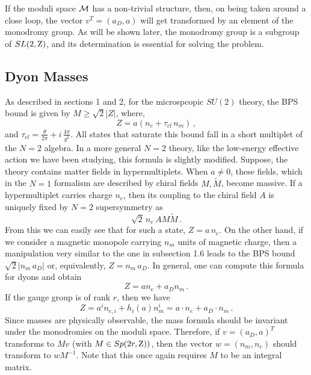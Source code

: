 If the moduli space ${\cal M}$ has a non-trivial structure, then, on
being taken around a close loop, the vector $v^T=(a_D, a)$ will get
transformed by an element of the monodromy group. As  will be shown
later, the monodromy group is a subgroup of $SL(2,{\rm Z})$, and its
determination is essential for solving the problem. 

\subsection{Dyon Masses}

As described in sections 1 and 2, for the microspcopic $SU(2)$ theory,
the BPS bound is given by $M \geq \sqrt{2} |Z|$, where,
$$
Z=a(n_e + \tau_{cl}\, n_m)\,, 
$$
and $\tau_{cl}=\frac{\theta}{2\pi}+i\,\frac{4\pi}{g^2}$. All states
that saturate this bound fall in a short multiplet of the $N=2$
algebra. In a more general $N=2$ theory, like the low-energy effective
action we have been studying, this formula is slightly modified. 
Suppose, the theory contains matter fields in hypermultiplets. When
$a\ne 0$, these fields, which in the $N=1$ formalism are described by
chiral fields $M, \widetilde M$, become massive. If a hypermultiplet
carries charge $n_e$, then its coupling to the chiral field $A$ is
uniquely fixed by $N=2$ supersymmetry as 
$$
\sqrt{2}\,n_e \, A M \widetilde M\,.
$$
From this we can easily see that for such a state, $Z=a\,n_e$. On the
other hand, if we consider a magnetic monopole carrying $n_m$ units of
magnetic charge, then a manipulation very similar to the one in
subsection 1.6 leads to the BPS bound $\sqrt{2}|n_m\,a_D|$ or,
equivalently, $Z=n_m\,a_D$. In general, one can compute this formula
for dyons and obtain 
\begin{equation}
Z = a n_e + a_D n_m\,.
\label{ZaaD}
\end{equation}
If the gauge group is of rank $r$, then we have
$$
Z = a^i n_{e,i} + h_i(a) n^i_m =a\cdot n_e +a_D \cdot n_m\,.
$$
Since masses are physically observable, the mass formula should be
invariant under the monodromies on the moduli space. Therefore, if
$v=(a_D, a)^T$ transforms to $M v$ (with $M\in Sp(2r,{\rm Z}) )$, then
the vector $w= (n_m, n_e)$ should transform to $w M^{-1}$. Note that
this once again requires $M$ to be an integral matrix. 

